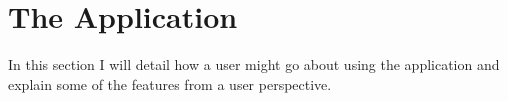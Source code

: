 \section{The Application}

In this section I will detail how a user might go about using the application and explain some of the features from a user perspective.



